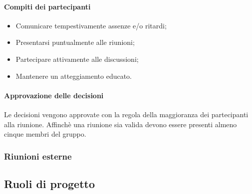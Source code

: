                      \paragraph{Compiti dei partecipanti}
                        \begin{itemize}
                            \item Comunicare tempestivamente assenze e/o ritardi; 
                            \item Presentarsi puntualmente alle riunioni;
                            \item Partecipare attivamente alle discussioni;
                            \item Mantenere un atteggiamento educato.
                        \end{itemize}
                    \paragraph{Approvazione delle decisioni}
                        Le decisioni vengono approvate con la regola della maggioranza dei partecipanti alla riunione.
                        Affinchè una riunione sia valida devono essere presenti almeno cinque membri del gruppo.
                        
                  \subsubsection{Riunioni esterne}
                  
            \subsection{Ruoli di progetto}
                  
                       
                     
                
            
    
     
            
            